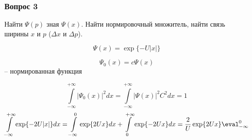 \subsubsection*{Вопрос 3}

Найти $\Psi(p)$ зная $\Psi(x)$. Найти нормировочный множитель, найти связь ширины
$x$  и $p$ ($\Delta x$ и $\Delta p$).

$$\Psi(x)=\exp\{-U|x|\}$$

$$\Psi_0(x)=c \Psi(x)$$-- нормированная функция

$$\int\limits_{-\infty}^{+\infty}|\Psi_0(x)|^2 dx 
= \int\limits_{-\infty}^{+\infty}|\Psi(x)|^2C^2 dx=1
$$
$$\int\limits_{-\infty}^{+\infty}\exp\{-2U|x|\}dx=\int\limits_{-\infty}^{0}\exp\{2Ux\}dx+\int\limits_{0}^{+\infty}\exp\{-2Ux\}dx = \frac2U \exp\{2Ux\}\eval_{-\infty}^0$$
